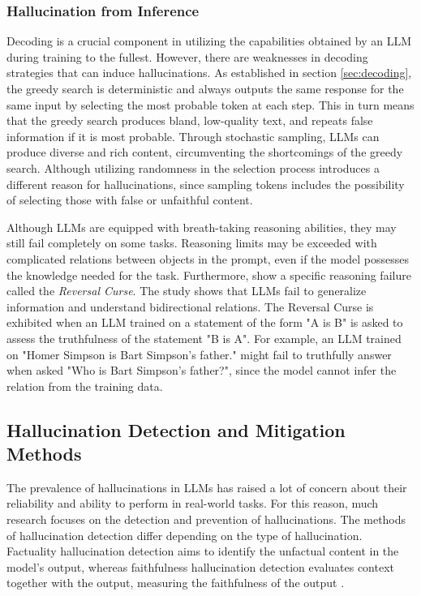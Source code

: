 \documentclass[english, 12pt, a4paper, sci, utf8, a-2b, online]{../definitions/aaltothesis}
\begin{document}
\subsubsection{Hallucination from Inference} \label{sec:inference_hallucination}

Decoding is a crucial component in utilizing the capabilities obtained by an LLM during training to the fullest. However, there are weaknesses in decoding strategies that can induce hallucinations. As established in section \ref{sec:decoding}, the greedy search is deterministic and always outputs the same response for the same input by selecting the most probable token at each step. This in turn means that the greedy search produces bland, low-quality text, and repeats false information if it is most probable. Through stochastic sampling,  LLMs can produce diverse and rich content, circumventing the shortcomings of the greedy search. Although utilizing randomness in the selection process introduces a different reason for hallucinations, since sampling tokens includes the possibility of selecting those with false or unfaithful content.

Although LLMs are equipped with breath-taking reasoning abilities, they may still fail completely on some tasks. Reasoning limits may be exceeded with complicated relations between objects in the prompt, even if the model possesses the knowledge needed for the task. Furthermore, \textcite{berglund2024reversalcursellmstrained} show a specific reasoning failure called the \textit{Reversal Curse}. The study shows that LLMs fail to generalize information and understand bidirectional relations. The Reversal Curse is exhibited when an LLM trained on a statement of the form "A is B" is asked to assess the truthfulness of the statement "B is A". For example, an LLM trained on "Homer Simpson is Bart Simpson's father." might fail to truthfully answer when asked "Who is Bart Simpson's father?", since the model cannot infer the relation from the training data.  



\subsection{Hallucination Detection and Mitigation Methods}

The prevalence of hallucinations in LLMs has raised a lot of concern about their reliability and ability to perform in real-world tasks. For this reason, much research focuses on the detection and prevention of hallucinations. The methods of hallucination detection differ depending on the type of hallucination. Factuality hallucination detection aims to identify the unfactual content in the model's output, whereas faithfulness hallucination detection evaluates context together with the output, measuring the faithfulness of the output \cite{10.1145/3703155}. 
\end{document}
